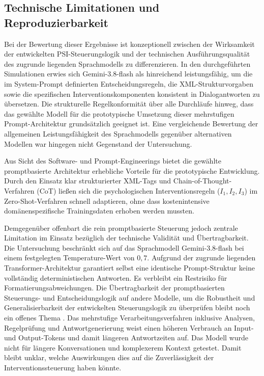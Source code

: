 \subsection{Technische Limitationen und Reproduzierbarkeit}
Bei der Bewertung dieser Ergebnisse ist konzeptionell zwischen der Wirksamkeit der entwickelten PSI-Steuerungslogik und der technischen Ausführungsqualität des zugrunde liegenden Sprachmodells zu differenzieren. 
In den durchgeführten Simulationen erwies sich Gemini-3.8-flash als hinreichend leistungsfähig, um die im System-Prompt definierten Entscheidungsregeln, die XML-Strukturvorgaben sowie die spezifischen Interventionskomponenten konsistent in Dialogantworten zu übersetzen. 
Die strukturelle Regelkonformität über alle Durchläufe hinweg, dass das gewählte Modell für die prototypische Umsetzung dieser mehrstufigen Prompt-Architektur grundsätzlich geeignet ist. 
Eine vergleichende Bewertung der allgemeinen Leistungsfähigkeit des Sprachmodells gegenüber alternativen Modellen war hingegen nicht Gegenstand der Untersuchung.

Aus Sicht des Software- und Prompt-Engineerings bietet die gewählte promptbasierte 
Architektur erhebliche Vorteile für die prototypische Entwicklung. Durch den Einsatz 
klar strukturierter XML-Tags und Chain-of-Thought-Verfahren (CoT) ließen sich 
die psychologischen Interventionsregeln ($I_1, I_2, I_3$) im Zero-Shot-Verfahren 
schnell adaptieren, ohne dass kostenintensive domänenspezifische Trainingsdaten erhoben 
werden mussten. 

Demgegenüber offenbart die rein promptbasierte Steuerung jedoch zentrale Limitation im Einsatz bezüglich der technische 
Validität und Übertragbarkeit.
Die Untersuchung beschränkt sich auf das Sprachmodell Gemini-3.8-flash bei einem 
festgelegten Temperature-Wert von $0{,}7$. Aufgrund der zugrunde liegenden Transformer-Architektur \citep{vaswani2017attention} 
garantiert selbst eine identische Prompt-Struktur keine vollständig deterministischen 
Antworten. Es verbleibt ein Restrisiko für Formatierungsabweichungen. Die Übertragbarkeit der promptbasierten Steuerungs- und Entscheidungslogik auf andere Modelle, um die Robustheit und Generalisierbarkeit der entwickelten Steuerungslogik zu überprüfen bleibt noch ein offenes Thema \citep{Raiaan2024A}.
Das mehrstufige Verarbeitungsverfahren inklusive Analysen, Regelprüfung und Antwortgenerierung weist einen
höheren Verbrauch an Input- und Output-Tokens und damit längeren Antwortzeiten auf.
Das Modell wurde nicht für längere Konversationen und komplexerem Kontext getestet.
Damit bleibt unklar, welche Auswirkungen dies auf die Zuverlässigkeit der 
Interventionssteuerung haben könnte.


